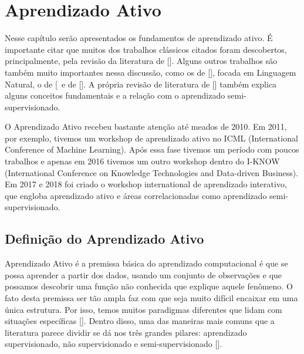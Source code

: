 \chapter{Aprendizado Ativo}
\label{cap:aprendizado_ativo}


Nesse capítulo serão apresentados os fundamentos de aprendizado ativo. É importante citar que muitos dos trabalhos clássicos citados foram descobertos, principalmente, pela revisão da literatura de [\cite{settles2012active, settles2014active}]. Alguns outros trabalhos são também muito importantes nessa discussão, como os de [\cite{olsson2009literature}], focada em Linguagem Natural, o de [\cite{aggarwal2014active}\ e de [\cite{wang2011active}]. A própria revisão de literatura de [\cite{zhu2006semi}] também explica alguns conceitos fundamentais e a relação com o aprendizado semi-supervisionado.

O Aprendizado Ativo recebeu bastante atenção até meados de 2010. Em 2011, por exemplo, tivemos um workshop de aprendizado ativo no ICML (International Conference of Machine Learning). Após essa fase tivemos um período com poucos trabalhos e apenas em 2016 tivemos um outro workshop dentro do I-KNOW (International Conference on Knowledge Technologies and Data-driven Business). Em 2017 e 2018 foi criado o workshop international de aprendizado interativo, que engloba aprendizado ativo e áreas correlacionadas como aprendizado semi-supervisionado.


\section{Definição do Aprendizado Ativo}
\label{sec:definicao}


Aprendizado Ativo é a premissa básica do aprendizado computacional é que se possa aprender a partir dos dados, usando um conjunto de observações e que possamos descobrir uma função não conhecida que explique aquele fenômeno. O fato desta premissa ser tão ampla faz com que seja muito difícil encaixar em uma única estrutura. Por isso, temos muitos paradigmas diferentes que lidam com situações específicas [\cite{abu2012learning}]. Dentro disso, uma das maneiras mais comuns que a literatura parece dividir se dá nos três grandes pilares: aprendizado supervisionado, não supervisionado e semi-supervisionado [\cite{abu2012learning}]. 


